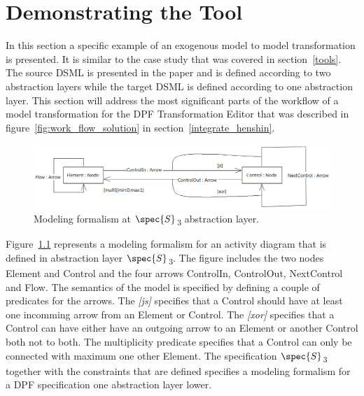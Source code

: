 
\chapter{Demonstrating the Tool} %

\label{Chapter6} %


In this section a specific example of an exogenous model to model
transformation is presented. It is similar to the case study that was covered
in section~\ref{tools}. The source DSML is presented in the
paper\cite{Lamo2013} and is defined according to two abstraction layers while
the target DSML is defined according to one abstraction layer. This section
will address the most significant parts of the workflow of a model
transformation for the DPF Transformation Editor that was described in
figure~\ref{fig:work_flow_solution} in section~\ref{integrate_henshin}.

\begin{figure}[H]
	\centering
	\includegraphics[scale=0.5]{./Figures/DPFactivityMetamodel_1.png}
	\caption[Source modeling formalism one abstraction layer higher]
	{Modeling formalism at $\spec{S}$\textsubscript{3} abstraction layer.}
	\label{fig:source_DSL_1}
\end{figure}

Figure~\ref{fig:source_DSL_1} represents a modeling formalism for an activity
diagram that is defined in abstraction layer $\spec{S}$\textsubscript{3}. The
figure includes the two nodes Element and Control and the four arrows ControlIn,
ControlOut, NextControl and Flow. The semantics of the model is specified by
defining a couple of predicates for the arrows. The \textit{[js]} specifies that
a Control should have at least one incomming arrow from an Element or Control.
The \textit{[xor]} specifies that a Control can have either have an outgoing
arrow to an Element or another Control both not to both. The multiplicity
predicate specifies that a Control can only be connected with maximum one other
Element. The specification $\spec{S}$\textsubscript{3} together with the
constraints that are defined specifies a modeling formalism for a DPF
specification one abstraction layer lower.


